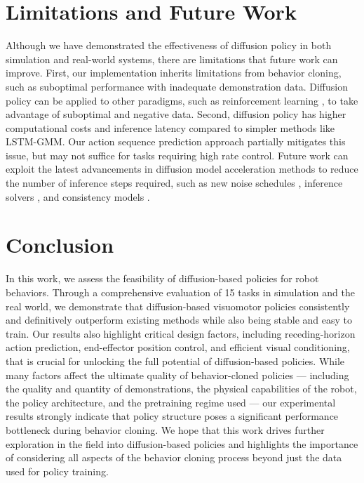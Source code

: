



\section{Limitations and Future Work}




Although we have demonstrated the effectiveness of diffusion policy in both simulation and real-world systems, there are limitations that future work can improve. 
First, our implementation inherits limitations from behavior cloning, such as suboptimal performance with inadequate demonstration data. Diffusion policy can be applied to other paradigms, such as reinforcement learning \cite{wang2023diffusion,hansen2023idql}, to take advantage of suboptimal and negative data. 
Second, diffusion policy has higher computational costs and inference latency compared to simpler methods like LSTM-GMM. Our action sequence prediction approach partially mitigates this issue, but may not suffice for tasks requiring high rate control. Future work can exploit the latest advancements in diffusion model acceleration methods to reduce the number of inference steps required, such as new noise schedules \cite{chen2023importance}, inference solvers \cite{karras2022elucidating}, and consistency models \cite{song2023consistency}.


\section{Conclusion}




In this work, we assess the feasibility of diffusion-based policies for robot behaviors. Through a comprehensive evaluation of 15 tasks in simulation and the real world, we demonstrate that diffusion-based visuomotor policies consistently and definitively outperform existing methods while also being stable and easy to train. Our results also highlight critical design factors, including receding-horizon action prediction, end-effector position control, and efficient visual conditioning, that is crucial for unlocking the full potential of diffusion-based policies. While many factors affect the ultimate quality of behavior-cloned policies --- including the quality and quantity of demonstrations, the physical capabilities of the robot, the policy architecture, and the pretraining regime used --- our experimental results strongly indicate that policy structure poses a significant performance bottleneck during behavior cloning. We hope that this work drives further exploration in the field into diffusion-based policies and highlights the importance of considering all aspects of the behavior cloning process beyond just the data used for policy training.


